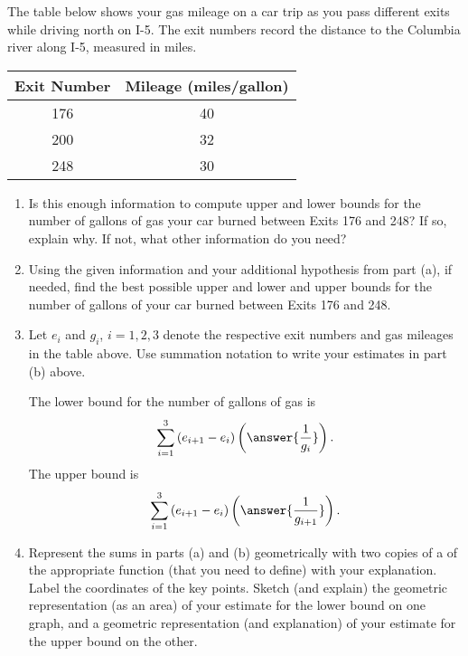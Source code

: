 \documentclass{ximera}
\begin{document}
\begin{exercise}  \label{ExY6r3erMMdvb}

The table below shows your gas mileage on a car trip as you pass different exits while driving north on I-5. The exit numbers record the distance to the Columbia river along I-5, measured in miles.


\begin{tabular}{|c|c|}
\hline
Exit Number & Mileage (miles/gallon) \\
\hline
176 & 40 \\  \hline
200 & 32 \\ \hline
248 & 30 \\
\hline
\end{tabular}

\begin{enumerate}

\item Is this enough information to compute upper and lower bounds for the number of gallons of gas your car burned between Exits 176 and 248? If so, explain why. If not, what other information do you need?

\item Using the given information and your additional hypothesis from part (a), if needed, find the best possible upper and lower and upper bounds for the number of gallons of your car burned between Exits 176 and 248. 

\item Let $e_i$ and $g_i$, $i=1,2,3$ denote the respective exit numbers and gas mileages in the table above. Use summation notation to write your estimates in part (b) above.

The lower bound for the number of gallons of gas is
\[
  \sum_{i=1}^3 \left( e_{i+1} - e_{i}  \right)\left( \answer{\frac{1}{g_i}}  \right) .
\]
The upper bound is
\[
  \sum_{i=1}^3 \left( e_{i+1} - e_{i}  \right)\left( \answer{\frac{1}{g_{i+1}}}  \right) .
\]


\item Represent the sums in parts (a) and (b) geometrically with two copies of a of the appropriate function (that you need to define) with your explanation. Label the coordinates of the key points. Sketch (and explain) the geometric representation (as an area) of your estimate for the lower bound on one graph, and a geometric representation (and explanation) of your estimate for the upper bound on the other. 

\end{enumerate}
\end{exercise}
\end{document}
